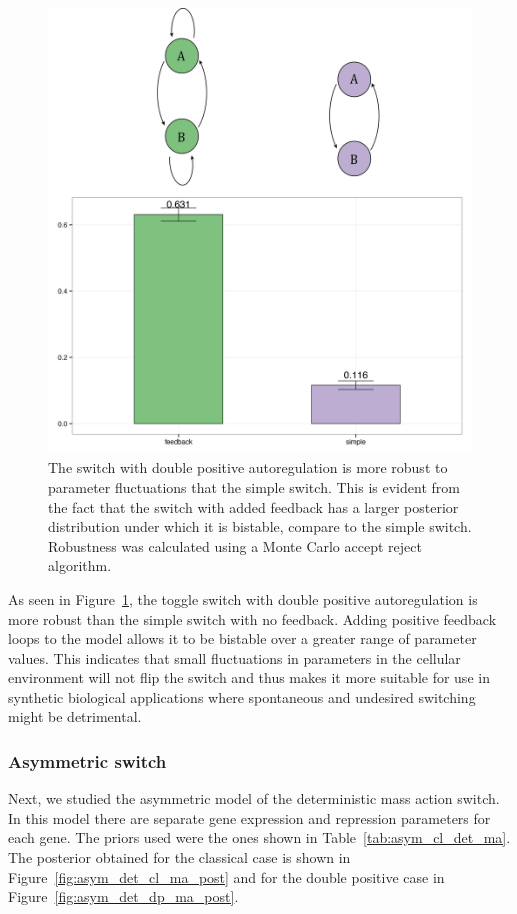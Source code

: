 \begin{figure}[h]
\centering
\includegraphics[scale=0.5]{chapterModelling/mass_action_switches/deterministic/MA_robustness_cartoon.png}
\caption[The robustness of the double positive and the simple switch mass action models]{The switch with double positive autoregulation is more robust to parameter fluctuations that the simple switch. This is evident from the fact that the switch with added feedback has a larger posterior distribution under which it is bistable, compare to the simple switch. Robustness was calculated using a Monte Carlo accept reject algorithm. }
\label{fig:robust_std_doubpos}
\end{figure}
As seen in Figure~\ref{fig:robust_std_doubpos}, the toggle switch with double positive autoregulation is more robust than the simple switch with no feedback. Adding positive feedback loops to the model allows it to be bistable over a greater range of parameter values. This indicates that small fluctuations in parameters in the cellular environment will not flip the switch and thus makes it more suitable for use in synthetic biological applications where spontaneous and undesired switching might be detrimental. 
\clearpage

\subsubsection{Asymmetric switch}
Next, we studied the asymmetric model of the deterministic mass action switch. In this model there are separate gene expression and repression parameters for each gene. The priors used were the ones shown in Table~\ref{tab:asym_cl_det_ma}. The posterior obtained for the classical case is shown in Figure~\ref{fig:asym_det_cl_ma_post} and for the double positive case in Figure~\ref{fig:asym_det_dp_ma_post}.

